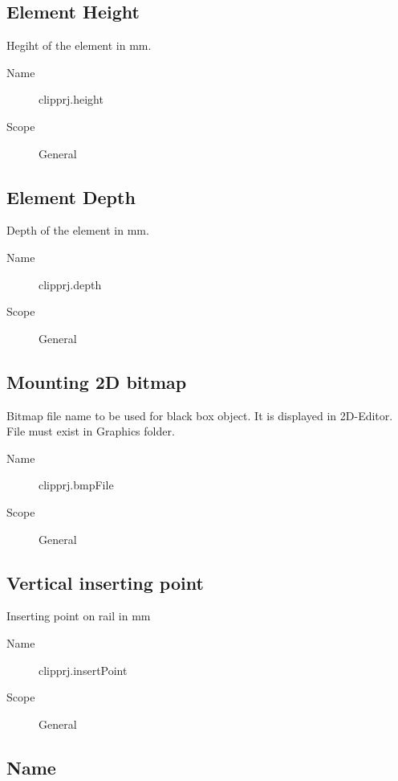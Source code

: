 \documentclass[%
	a4paper,
	oneside,
	listof=numbered,
	parskip=half,
	headsepline=true,
	footsepline=false,
	normalheadings,
	0.7headlines,
	headexclude,
	]{scrbook}
\begin{document}
\subsection{Element Height}

Hegiht of the element in mm.

\begin{description}
	\item[Name] clipprj.height
	\item[Scope] General
\end{description}

\subsection{Element Depth}

Depth of the element in mm.

\begin{description}
	\item[Name] clipprj.depth
	\item[Scope] General
\end{description}

\subsection{Mounting 2D bitmap}

Bitmap file name to be used for black box object.
It is displayed in 2D-Editor.
File must exist in Graphics folder.

\begin{description}
	\item[Name] clipprj.bmpFile
	\item[Scope] General
\end{description}

\subsection{Vertical inserting point}

Inserting point on rail in mm

\begin{description}
	\item[Name] clipprj.insertPoint
	\item[Scope] General
\end{description}

\subsection{Name}
\end{document}
